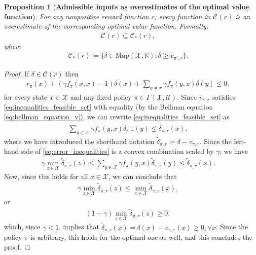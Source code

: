 \documentclass[10pt,a4paper]{amsart}
\newtheorem{proposition}{Proposition}
\newcommand{\R}{\mathbb{R}}
\newcommand{\Sect}{\Gamma(\X, \U)}
\newcommand{\U}{\mathcal{U}}
\newcommand{\X}{\mathcal{X}}
\newcommand{\advset}[2]{\mathcal{C}_{#1}(#2)}
\newcommand{\cost}{r}
\newcommand{\costfb}[1]{\cost_{#1}}
\newcommand{\disc}{\gamma}
\newcommand{\f}{f}
\newcommand{\ffb}[1]{\f_{#1}}
\newcommand{\maps}{\text{Map}}
\newcommand{\policy}{\pi}
\newcommand{\state}{x} %
\newcommand{\vvarg}[1]{v_{#1}}
\begin{document}
\begin{proposition}[\textbf{Admissible inputs as overestimates of the optimal value function}]\label{prop:feas_set_as_overestimates}
    For any nonpositive reward function $\cost$, every function in $\advset{}{\cost}$ is an overestimate of the corresponding optimal value function. Formally:
    \begin{align*}
        \advset{}{\cost} \subseteq \mathcal{C}_*(\cost),
    \end{align*}
    where
    \begin{align}\label{eq:overestimates_set}
        \mathcal{C}_*(\cost) \coloneqq \{\delta \in \maps(\X, \R) : \delta \geq \vvarg{\policy^*\!, \cost}\}.
    \end{align}
\end{proposition}

\begin{proof}
    If $\delta \in \advset{}{\cost}$ then
    \begin{align}\label{eq:inequalities_feasible_set}
        \costfb{\policy}(\state) + (\disc \text{$\ffb{\policy}(\state, \state)$} - 1) \delta(\state) + \sum_{y \neq \state} \disc \ffb{\policy}(y, \state) \delta(y) \leq 0,
    \end{align}
    for every state $\state \in \X$ and any fixed policy $\policy \in \Sect$. Since $\vvarg{\policy\!, \cost}$ satisfies \eqref{eq:inequalities_feasible_set} with equality (by the Bellman equation \eqref{eq:bellman_equation_v}), we can rewrite \eqref{eq:inequalities_feasible_set} as
    \begin{align}\label{eq:error_inequalities}
        \sum_{y \in \X} \disc \ffb{\policy}(y, \state) \tilde{\delta}_{\policy, \cost}(y) \leq \tilde{\delta}_{\policy, \cost}(\state),
    \end{align}
    where we have introduced the shorthand notation $\tilde{\delta}_{\policy, \cost} \coloneqq \delta - \vvarg{\policy\!, \cost}$. Since the left-hand side of \eqref{eq:error_inequalities} is a convex combination scaled by $\disc$, we have
    \begin{align*}
        \disc \min_{z \in \X} \tilde{\delta}_{\policy, \cost}(z) \leq \sum_{y \in \X} \disc \ffb{\policy}(y, \state) \tilde{\delta}_{\policy, \cost}(y) \leq \tilde{\delta}_{\policy, \cost}(\state).
    \end{align*}
    Now, since this holds for all $\state \in \X$, we can conclude that
    \begin{align*}
        \disc \min_{z \in \X} \tilde{\delta}_{\policy, \cost}(z) \leq \min_{x \in \X} \tilde{\delta}_{\policy, \cost}(x),
    \end{align*}
    or
    \begin{align*}
        (1 - \disc)\min_{z \in \X} \tilde{\delta}_{\policy, \cost}(z) \geq 0,
    \end{align*}
    which, since $\disc < 1$, implies that $\tilde{\delta}_{\policy, \cost}(\state) = \delta(\state) - \vvarg{\policy\!, \cost}(\state) \geq 0, \forall \state$. Since the policy $\policy$ is arbitrary, this holds for the optimal one as well, and this concludes the proof.
\end{proof}
\end{document}
